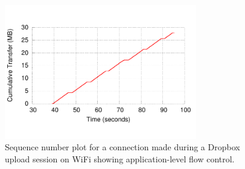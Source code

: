 \documentclass[letterpaper]{sig-alternate-10pt}
\begin{document}
\begin{figure}[ht]
\centering
\includegraphics[width=3.3in]{figures/db_big_u}
\caption{Sequence number plot for a connection made during a Dropbox upload session on WiFi showing application-level flow control.}
\label{fig:dbu}
\end{figure}






\end{document}
